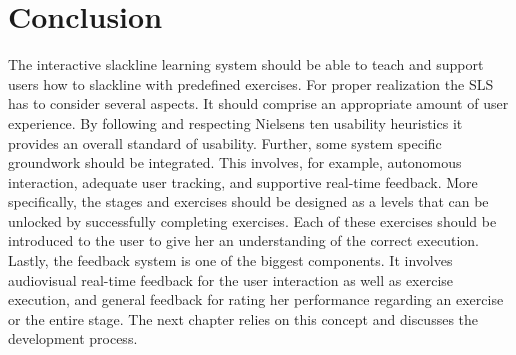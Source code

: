 \section{Conclusion}\label{4_7_conclusion}
The interactive slackline learning system should be able to teach and support users how to slackline with predefined exercises. For proper realization the SLS has to consider several aspects. It should comprise an appropriate amount of user experience. By following and respecting Nielsens ten usability heuristics it provides an overall standard of usability. Further, some system specific groundwork should be integrated. This involves, for example, autonomous interaction, adequate user tracking, and supportive real-time feedback. More specifically, the stages and exercises should be designed as a levels that can be unlocked by successfully completing exercises. Each of these exercises should be introduced to the user to give her an understanding of the correct execution. Lastly, the feedback system is one of the biggest components. It involves audiovisual real-time feedback for the user interaction as well as exercise execution, and general feedback for rating her performance regarding an exercise or the entire stage. The next chapter \textit{} relies on this concept and discusses the development process.

